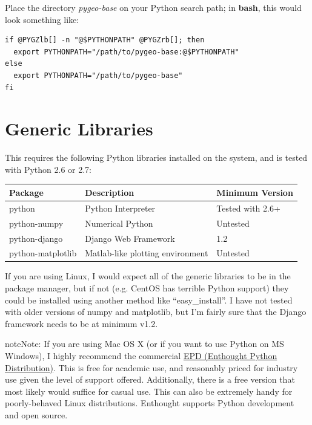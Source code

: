 \documentclass[letterpaper,10pt,english]{sphinxmanual}
\begin{document}
Place the directory \emph{pygeo-base} on your Python search path; in \textbf{bash}, this would look something like:

\begin{Verbatim}[commandchars=@\[\]]
if @PYGZlb[] -n "@$PYTHONPATH" @PYGZrb[]; then
  export PYTHONPATH="/path/to/pygeo-base:@$PYTHONPATH"
else
  export PYTHONPATH="/path/to/pygeo-base"
fi
\end{Verbatim}


\section{Generic Libraries}
\label{installation:generic-libraries}
This requires the following Python libraries installed on the system, and is tested with Python 2.6 or 2.7:

\begin{tabulary}{\linewidth}{|L|L|L|}
\hline
\textbf{
Package
} & \textbf{
Description
} & \textbf{
Minimum Version
}\\
\hline

python
 & 
Python Interpreter
 & 
Tested with 2.6+
\\

python-numpy
 & 
Numerical Python
 & 
Untested
\\

python-django
 & 
Django Web Framework
 & 
1.2
\\

python-matplotlib
 & 
Matlab-like plotting environment
 & 
Untested
\\
\hline
\end{tabulary}


If you are using Linux, I would expect all of the generic libraries to be in the package manager, but if not (e.g. CentOS has terrible Python support) they could be installed using another method like ``easy\_install''.  I have not tested with older versions of numpy and matplotlib, but I'm fairly sure that the Django framework needs to be at minimum v1.2.

\begin{notice}{note}{Note:}
If you are using Mac OS X (or if you want to use Python on MS Windows), I highly recommend the commercial \href{http://www.enthought.com/products/epd.php}{EPD (Enthought Python Distribution)}.  This is free for academic use, and reasonably priced for industry use given the level of support offered.  Additionally, there is a free version that most likely would suffice for casual use.  This can also be extremely handy for poorly-behaved Linux distributions.  Enthought supports Python development and open source.
\end{notice}
\end{document}
